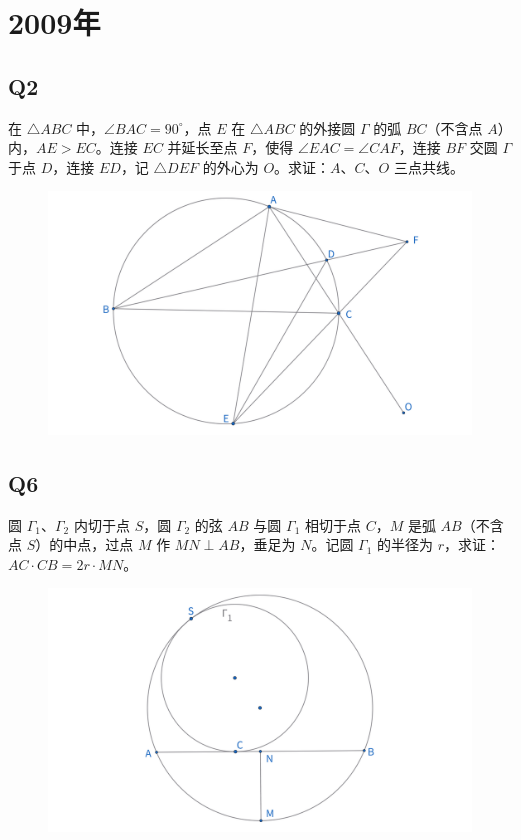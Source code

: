 \documentclass{article}
\begin{document}
\newpage
\section{2009年}
\subsection{Q2}
在 $\triangle ABC$ 中，$\angle BAC = 90^\circ$，点 $E$ 在 $\triangle ABC$ 的外接圆 $\Gamma$ 的弧 $BC$（不含点 $A$）内，$AE > EC$。连接 $EC$ 并延长至点 $F$，使得 $\angle EAC = \angle CAF$，连接 $BF$ 交圆 $\Gamma$ 于点 $D$，连接 $ED$，记 $\triangle DEF$ 的外心为 $O$。求证：$A$、$C$、$O$ 三点共线。
\begin{figure}[htbp]
	\centering
	\includegraphics[width=0.8\linewidth]{figures/女子赛09年Q2.png}
\end{figure}

\subsection{Q6}
圆 $\Gamma_1$、$\Gamma_2$ 内切于点 $S$，圆 $\Gamma_2$ 的弦 $AB$ 与圆 $\Gamma_1$ 相切于点 $C$，$M$ 是弧 $AB$（不含点 $S$）的中点，过点 $M$ 作 $MN \perp AB$，垂足为 $N$。记圆 $\Gamma_1$ 的半径为 $r$，求证：$AC \cdot CB = 2r \cdot MN$。
\begin{figure}[htbp]
	\centering
	\includegraphics[width=0.8\linewidth]{figures/女子赛09年Q6.png}
\end{figure}
\end{document}
